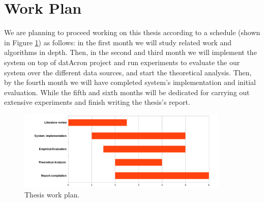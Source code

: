 \section{Work Plan}

We are planning to proceed working on this thesis according to a schedule (shown in Figure \ref{fig:work_plan}) as follows: in the first month we will study related work and algorithms in depth. Then, in the second and third month we will implement the system on top of
datAcron project and run experiments to evaluate the our system over the different data sources, and start the theoretical analysis. Then, by the fourth month we will have completed system's implementation and initial evaluation. While the fifth and sixth months will be dedicated for carrying out extensive experiments and finish  writing the thesis's report.

\begin{figure}[!ht]
	\begin{centering}
		
			\includegraphics[width=0.9\textwidth]{figures/plan.png}	
	
		\caption{Thesis work plan.}  
			\label{fig:work_plan}
	\end{centering}
\end{figure}